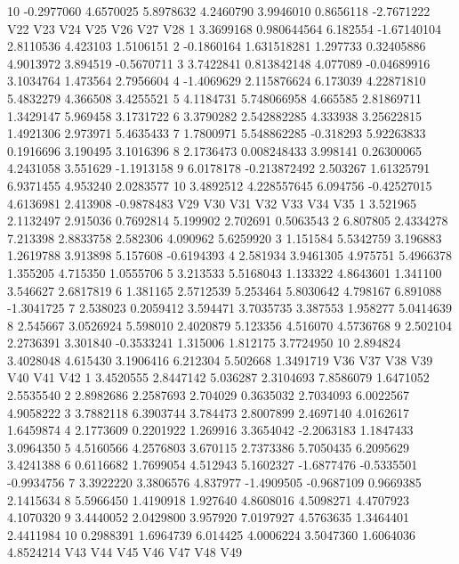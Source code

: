 \documentclass[12pt]{article}
\begin{document}
\begin{Schunk}
\begin{Soutput}
10 -0.2977060 4.6570025  5.8978632  4.2460790  3.9946010  0.8656118 -2.7671222
          V22          V23       V24         V25       V26      V27        V28
1   3.3699168  0.980644564  6.182554 -1.67140104 2.8110536 4.423103  1.5106151
2  -0.1860164  1.631518281  1.297733  0.32405886 4.9013972 3.894519 -0.5670711
3   3.7422841  0.813842148  4.077089 -0.04689916 3.1034764 1.473564  2.7956604
4  -1.4069629  2.115876624  6.173039  4.22871810 5.4832279 4.366508  3.4255521
5   4.1184731  5.748066958  4.665585  2.81869711 1.3429147 5.969458  3.1731722
6   3.3790282  2.542882285  4.333938  3.25622815 1.4921306 2.973971  5.4635433
7   1.7800971  5.548862285 -0.318293  5.92263833 0.1916696 3.190495  3.1016396
8   2.1736473  0.008248433  3.998141  0.26300065 4.2431058 3.551629 -1.1913158
9   6.0178178 -0.213872492  2.503267  1.61325791 6.9371455 4.953240  2.0283577
10  3.4892512  4.228557645  6.094756 -0.42527015 4.6136981 2.413908 -0.9878483
        V29       V30      V31        V32      V33      V34        V35
1  3.521965 2.1132497 2.915036  0.7692814 5.199902 2.702691  0.5063543
2  6.807805 2.4334278 7.213398  2.8833758 2.582306 4.090962  5.6259920
3  1.151584 5.5342759 3.196883  1.2619788 3.913898 5.157608 -0.6194393
4  2.581934 3.9461305 4.975751  5.4966378 1.355205 4.715350  1.0555706
5  3.213533 5.5168043 1.133322  4.8643601 1.341100 3.546627  2.6817819
6  1.381165 2.5712539 5.253464  5.8030642 4.798167 6.891088 -1.3041725
7  2.538023 0.2059412 3.594471  3.7035735 3.387553 1.958277  5.0414639
8  2.545667 3.0526924 5.598010  2.4020879 5.123356 4.516070  4.5736768
9  2.502104 2.2736391 3.301840 -0.3533241 1.315006 1.812175  3.7724950
10 2.894824 3.4028048 4.615430  3.1906416 6.212304 5.502668  1.3491719
         V36       V37      V38        V39        V40        V41        V42
1  3.4520555 2.8447142 5.036287  2.3104693  7.8586079  1.6471052  2.5535540
2  2.8982686 2.2587693 2.704029  0.3635032  2.7034093  6.0022567  4.9058222
3  3.7882118 6.3903744 3.784473  2.8007899  2.4697140  4.0162617  1.6459874
4  2.1773609 0.2201922 1.269916  3.3654042 -2.2063183  1.1847433  3.0964350
5  4.5160566 4.2576803 3.670115  2.7373386  5.7050435  6.2095629  3.4241388
6  0.6116682 1.7699054 4.512943  5.1602327 -1.6877476 -0.5335501 -0.9934756
7  3.3922220 3.3806576 4.837977 -1.4909505 -0.9687109  0.9669385  2.1415634
8  5.5966450 1.4190918 1.927640  4.8608016  4.5098271  4.4707923  4.1070320
9  3.4440052 2.0429800 3.957920  7.0197927  4.5763635  1.3464401  2.4411984
10 0.2988391 1.6964739 6.014425  4.0006224  3.5047360  1.6064036  4.8524214
         V43        V44        V45        V46       V47      V48       V49

\end{Soutput}
\end{Schunk}
\end{document}
